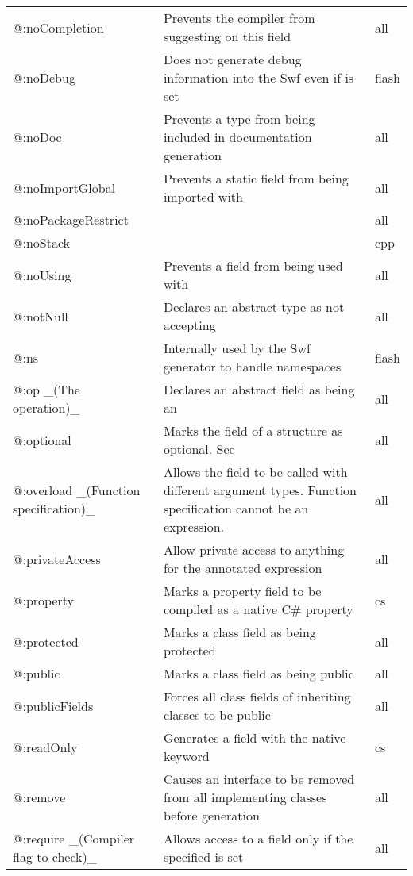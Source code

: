 \begin{center}
\begin{tabular}{| l | l | l |}
	@:noCompletion  &  Prevents the compiler from suggesting \tref{completion}{cr-completion} on this field  &  all \\
	@:noDebug &  Does not generate debug information into the Swf even if \expr{-debug} is set   &  flash \\
	@:noDoc  &  Prevents a type from being included in documentation generation  &  all \\
	@:noImportGlobal  &  Prevents a static field from being imported with \expr{import Class.*}  &  all \\
	@:noPackageRestrict  &    &  all \\
	@:noStack &     &  cpp \\
	@:noUsing &  Prevents a field from being used with \expr{using}  &  all \\
	@:notNull &  Declares an abstract type as not accepting \tref{\expr{null} values}{types-nullability}  &  all \\
	@:ns  &  Internally used by the Swf generator to handle namespaces   &  flash \\
	@:op \_(The operation)\_  &   Declares an abstract field as being an \tref{operator overload}{types-abstract-operator-overloading}  &  all \\
	@:optional  &  Marks the field of a structure as optional. See \tref{Optional Arguments}{types-nullability-optional-arguments}  &  all \\
	@:overload \_(Function specification)\_  &  Allows the field to be called with different argument types. Function specification cannot be an expression.  &  all \\
	@:privateAccess  &  Allow private access to anything for the annotated expression  &  all \\
	@:property  &  Marks a property field to be compiled as a native C\# property   &  cs \\
	@:protected  &  Marks a class field as being protected  &  all \\
	@:public  &  Marks a class field as being public  &  all \\
	@:publicFields  &  Forces all class fields of inheriting classes to be public  &  all \\
	@:readOnly  &  Generates a field with the \expr{readonly} native keyword   &  cs \\
	@:remove  &  Causes an interface to be removed from all implementing classes before generation  &  all \\
	@:require \_(Compiler flag to check)\_  &  Allows access to a field only if the specified \tref{compiler flag}{lf-condition-compilation} is set  &  all \\

\end{tabular}
\end{center}

